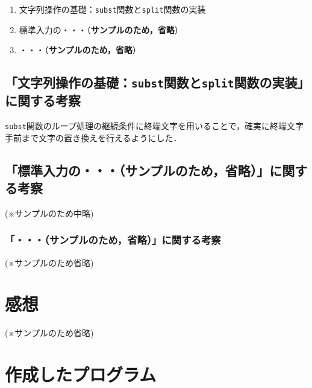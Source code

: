 \begin{enumerate}
\setlength{\parskip}{2pt} \setlength{\itemsep}{2pt}
    \item 文字列操作の基礎：\texttt{subst}関数と\texttt{split}関数の実装
    \item 標準入力の・・・（\textbf{サンプルのため，省略}）
    \item ・・・（\textbf{サンプルのため，省略}）
\end{enumerate}

\subsection{「文字列操作の基礎：\texttt{subst}関数と\texttt{split}関数の実装」に関する考察}

\verb|subst|関数のループ処理の継続条件に終端文字を用いることで，確実に終端文字手前まで文字の置き換えを行えるようにした．


\subsection{「標準入力の・・・（\textbf{サンプルのため，省略}）」に関する考察}

(※サンプルのため中略)

\subsubsection{「・・・（\textbf{サンプルのため，省略}）」に関する考察}

(※サンプルのため省略)



\section{感想}\label{sec:review}

(※サンプルのため省略)

\section{作成したプログラム}\label{sec:makep}

